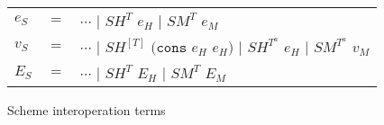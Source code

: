 \begin{figure}
\label{sit}
\caption{Scheme interoperation terms}
\begin{center}
\begin{tabular}{lcl}
$e_{S}$ & $=$ & $\cdots$ $\vert$ $SH^{T}$ $e_{H}$ $\vert$ $SM^{T}$ $e_{M}$ \\
$v_{S}$ & $=$ & $\cdots$ $\vert$ $SH^{[T]}$ $(\mathtt{cons}$ $e_{H}$ $e_{H})$ $\vert$ $SH^{T^{a}}$ $e_{H}$ $\vert$ $SM^{T^{a}}$ $v_{M}$ \\
$E_{S}$ & $=$ & $\cdots$ $\vert$ $SH^{T}$ $E_{H}$ $\vert$ $SM^{T}$ $E_{M}$
\end{tabular}
\end{center}
\end{figure}